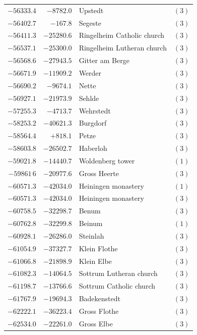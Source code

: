 \begin{center}
\begin{tabular}{r|r|p{170pt}|r}
\(-56333.4\)&\(-8782.0\)&Upstedt&\((3)\)\\
\(-56402.7\)&\(-167.8\)&Segeste&\((3)\)\\
\(-56411.3\)&\(-25280.6\)&Ringelheim Catholic church&\((3)\)\\
\(-56537.1\)&\(-25300.0\)&Ringelheim Lutheran church&\((3)\)\\
\(-56568.6\)&\(-27943.5\)&Gitter am Berge&\((3)\)\\
\(-56671.9\)&\(-11909.2\)&Werder&\((3)\)\\
\(-56690.2\)&\(-9674.1\)&Nette&\((3)\)\\
\(-56927.1\)&\(-21973.9\)&Sehlde&\((3)\)\\
\(-57255.3\)&\(-4713.7\)&Wehrstedt&\((3)\)\\
\(-58253.2\)&\(-40621.3\)&Burgdorf&\((3)\)\\
\(-58564.4\)&\(+818.1\)&Petze&\((3)\)\\
\(-58603.8\)&\(-26502.7\)&Haberloh&\((3)\)\\
\(-59021.8\)&\(-14440.7\)&Woldenberg tower&\((1)\)\\
\(-59861\,6\)&\(-20977.6\)&Gross Heerte&\((3)\)\\
\(-60571.3\)&\(-42034.0\)&Heiningen monastery&\((1)\)\\
\(-60571.3\)&\(-42034.0\)&Heiningen monastery&\((3)\)\\
\(-60758.5\)&\(-32298.7\)&Benum&\((3)\)\\
\(-60762.8\)&\(-32299.8\)&Beinum&\((1)\)\\
\(-60928.1\)&\(-26286.0\)&Steinlah&\((3)\)\\
\(-61054.9\)&\(-37327.7\)&Klein Flothe&\((3)\)\\
\(-61066.8\)&\(-21898.9\)&Klein Elbe&\((3)\)\\
\(-61082.3\)&\(-14064.5\)&Sottrum Lutheran church&\((3)\)\\
\(-61198.7\)&\(-13766.6\)&Sottrum Catholic church&\((3)\)\\
\(-61767.9\)&\(-19694.3\)&Badekenstedt&\((3)\)\\
\(-62222.1\)&\(-36223.4\)&Gross Flothe&\((3)\)\\
\(-62534.0\)&\(-22261.0\)&Gross Elbe&\((3)\)\\
\hline\end{tabular}\endgroup\end{center}
